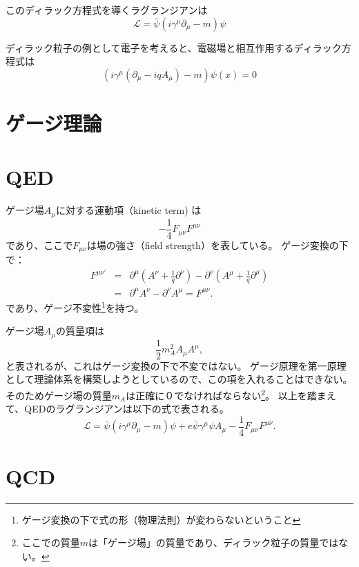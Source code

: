\documentclass[a4paper,11pt,uplatex]{jsreport}
\begin{document}
このディラック方程式を導くラグランジアンは
\begin{equation}
  \mathcal{L}=\bar{\psi}(i\gamma^{\mu}\partial_{\mu}-m)\psi
\end{equation}

ディラック粒子の例として電子を考えると、電磁場と相互作用するディラック方程式は
\begin{equation}
  (i\gamma^{\mu}(\partial_{\mu}-iqA_\mu)-m)\psi(x)=0
\end{equation}



\section{ゲージ理論}


\section{QED}

ゲージ場$A_{\mu}$に対する運動項（kinetic term) は
\begin{equation}
  -\frac{1}{4}F_{\mu\nu}F^{\mu\nu}
\end{equation}
であり、ここで$F_{\mu\nu}$は場の強さ（field strength）を表している。
ゲージ変換の下で：
\begin{eqnarray}
  F^{\mu\nu\prime}
  &=& \partial^{\mu}(A^{\nu}+\frac{1}{q}\partial^{\nu}) - \partial^{\nu}(A^{\mu}+\frac{1}{q}\partial^{\mu}) \\
  &=& \partial^{\mu}A^{\nu} - \partial^{\nu}A^{\mu} = F^{\mu\nu}.
\end{eqnarray}
であり、ゲージ不変性\footnote{ゲージ変換の下で式の形（物理法則）が変わらないということ}を持つ。

ゲージ場$A_{\mu}$の質量項は
\begin{equation}
  \frac{1}{2}m_A^2A_{\mu}A^{\mu},
\end{equation}
と表されるが、これはゲージ変換の下で不変ではない。
ゲージ原理を第一原理として理論体系を構築しようとしているので、この項を入れることはできない。
そのためゲージ場の質量$m_A$は正確に０でなければならない\footnote{ここでの質量$m$は「ゲージ場」の質量であり、ディラック粒子の質量ではない。}。
以上を踏まえて、QEDのラグランジアンは以下の式で表される。
\begin{equation}
  \mathcal{L} = \bar{\psi}(i\gamma^{\mu}\partial_{\mu}-m)\psi + e\bar{\psi}\gamma^{\mu}\psi A_{\mu} -\frac{1}{4}F_{\mu\nu}F^{\mu\nu}.
\end{equation}

\section{QCD}
\end{document}
